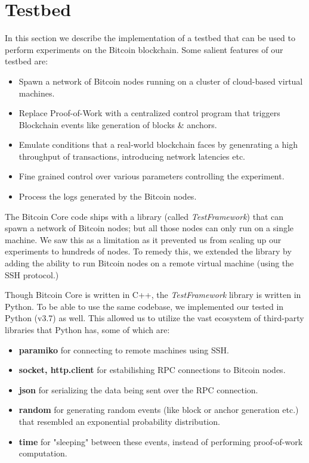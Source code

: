 \newpage
\section{Testbed} \label{impl-testbed}

In this section we describe the implementation of a testbed that can be used to perform experiments on the Bitcoin blockchain. Some salient features of our testbed are:

\begin{itemize}
    \item Spawn a network of Bitcoin nodes running on a cluster of cloud-based virtual machines.
    \item Replace Proof-of-Work with a centralized control program that triggers Blockchain events like generation of blocks \& anchors.
    \item Emulate conditions that a real-world blockchain faces by genenrating a high throughput of transactions, introducing network latencies etc.
    \item Fine grained control over various parameters controlling the experiment.
    \item Process the logs generated by the Bitcoin nodes.
\end{itemize}

The Bitcoin Core code ships with a library (called \textit{TestFramework}) that can spawn a network of Bitcoin nodes; but all those nodes can only run on a single machine. We saw this as a limitation as it prevented us from scaling up our experiments to hundreds of nodes. 
To remedy this, we extended the library by adding the ability to run Bitcoin nodes on a remote virtual machine (using the SSH protocol.)

Though Bitcoin Core is written in C++, the \textit{TestFramework} library is written in Python. To be able to use the same codebase, we implemented our tested in Python (v3.7) as well. 
This allowed us to utilize the vast ecosystem of third-party libraries that Python has, some of which are: 

\begin{itemize}
    \item \textbf{paramiko} for connecting to remote machines using SSH.
    \item \textbf{socket, http.client} for estabilishing RPC connections to Bitcoin nodes.
    \item \textbf{json} for serializing the data being sent over the RPC connection.
    \item \textbf{random} for generating random events (like block or anchor generation etc.) that resembled an exponential probability distribution.
    \item \textbf{time} for "sleeping" between these events, instead of performing proof-of-work computation. 
\end{itemize}

